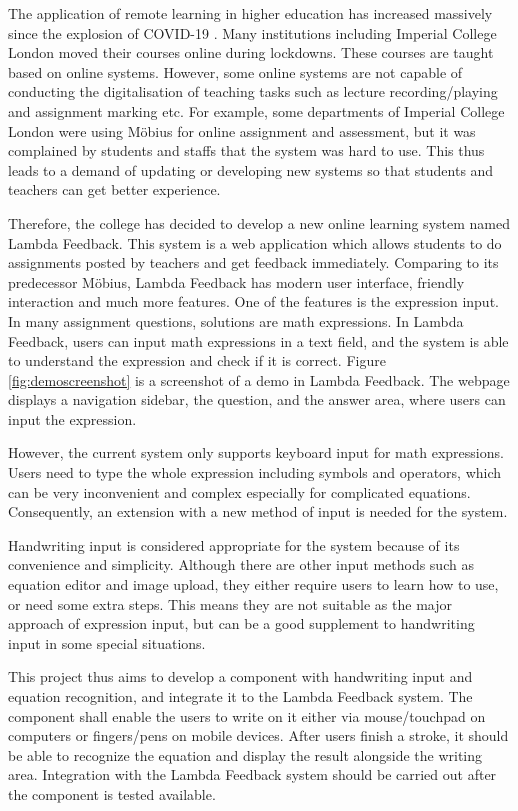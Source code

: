 \documentclass[12pt,twoside]{report}
\begin{document}
The application of remote learning in higher education has increased massively
since the explosion of COVID-19 \cite{remotelearning}. Many institutions including Imperial College
London moved their courses online during lockdowns. These courses are taught
based on online systems. However, some online systems are not capable of
conducting the digitalisation of teaching tasks such as lecture
recording/playing and assignment marking etc. For example, some departments of  Imperial College
London were using Möbius for online assignment and assessment, but it was complained by students and staffs that the system was hard to use. This thus leads to a demand of updating or developing new systems so that students and teachers can get better experience.

Therefore, the college has decided to develop a new online learning system named
Lambda Feedback. This system is a web application which allows students to do assignments posted by teachers and get feedback immediately. Comparing to its predecessor Möbius, Lambda
Feedback has modern user interface, friendly interaction and much more features.
One of the features is the expression input. In many assignment questions,
solutions are math expressions. In Lambda Feedback, users can input math
expressions in a text field, and the system is able to understand the expression
and check if it is correct. Figure \ref{fig:demoscreenshot} is a screenshot of a
demo in Lambda Feedback. The webpage displays a navigation sidebar,
the question, and the answer area, where users can input the expression.

However, the current system only supports keyboard input for math expressions.
Users need to type the whole expression including symbols and operators, which
can be very inconvenient and complex especially for complicated equations.
Consequently, an extension with a new method of input is needed for the system.

Handwriting input is considered appropriate for the system because of its
convenience and simplicity. Although there are other input methods such as
equation editor and image upload, they either require users to learn how to use,
or need some extra steps. This means they are not suitable as the major approach
of expression input, but can be a good supplement to handwriting input in some
special situations.

This project thus aims to develop a component with handwriting input and
equation recognition, and integrate it to the Lambda Feedback system. The
component shall enable the users to write on it either via mouse/touchpad on
computers or fingers/pens on mobile devices. After users finish a stroke, it should
be able to recognize the equation and display the result alongside the writing
area. Integration with the Lambda Feedback system should be carried out after
the component is tested available.
\end{document}
